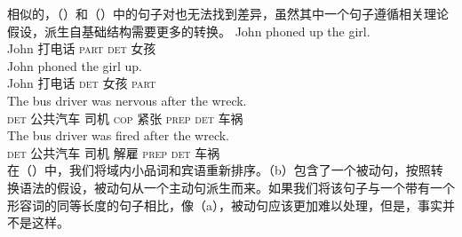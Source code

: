 相似的，（）和（）中的句子对也无法找到差异，虽然其中一个句子遵循相关理论假设，派生自基础结构需要更多的转换\citep*[]{FBG74a-u}。
\eal
\ex 
\gll John phoned up the girl.\\
    John 打电话 \textsc{part} \textsc{det} 女孩\\
\ex 
\gll John phoned the girl up.\\
    John 打电话 \textsc{det} 女孩 \textsc{part}\\
\zl
\eal
\ex 
\gll The bus driver was nervous after the wreck.\\
    \textsc{det} 公共汽车 司机 \textsc{cop} 紧张 \textsc{prep} \textsc{det} 车祸\\
\ex 
\gll The bus driver was fired after the wreck.\\
    \textsc{det} 公共汽车 司机 \passivepst{} 解雇 \textsc{prep} \textsc{det} 车祸\\
\zl
在（）中，我们将域内小品词和宾语重新排序。（b）包含了一个被动句，按照转换语法的假设，被动句从一个主动句派生而来。如果我们将该句子与一个带有一个形容词的同等长度的句子相比，像（a），被动句应该更加难以处理，但是，事实并不是这样。

